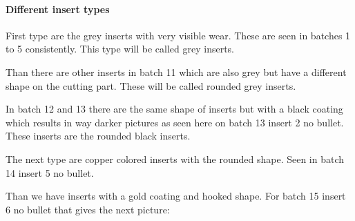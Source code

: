 \paragraph{Different insert types}

First type are the grey inserts with very visible wear. These are seen in batches 1 to 5 consistently. This type will be called grey inserts.

Than there are other inserts in batch 11 which are also grey but have a different shape on the cutting part. These will be called rounded grey inserts.

In batch 12 and 13 there are the same shape of inserts but with a black coating which results in way darker pictures as seen here on batch 13 insert 2 no bullet. These inserts are the rounded black inserts.

The next type are copper colored inserts with the rounded shape. Seen in batch 14 insert 5 no bullet.

Than we have inserts with a gold coating and hooked shape. For batch 15 insert 6 no bullet that gives the next picture:


